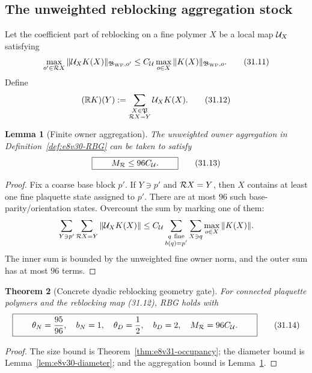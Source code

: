 \documentclass[11pt,oneside]{book}
\newtheorem{theorem}{Theorem}[chapter]
\newtheorem{lemma}[theorem]{Lemma}
\theoremstyle{definition}
\theoremstyle{remark}
\begin{document}
\subsection{The unweighted reblocking aggregation stock}

Let the coefficient part of reblocking on a fine polymer \(X\) be a
local map \({\cal U}_X\) satisfying
\[
 \max_{o'\in{\cal R}X}
 \|{\cal U}_XK(X)\|_{\mathfrak B_{\rm WP},o'}
 \leq C_{\cal U}
 \max_{o\in X}\|K(X)\|_{\mathfrak B_{\rm WP},o}.                  \tag{31.11}
\]
Define
\[
 ({\mathbb R}K)(Y):=
 \sum_{\substack{X\in{\mathfrak P}\\ {\cal R}X=Y}}
                         {\cal U}_XK(X).                          \tag{31.12}
\]

\begin{lemma}[Finite owner aggregation]
\label{lem:e8v31-aggregation}
The unweighted owner aggregation in
Definition~\ref{def:e8v30-RBG} can be taken to satisfy
\[
\boxed{\qquad
                         M_{\cal R}\leq96C_{\cal U}.
\qquad}                                                           \tag{31.13}
\]
\end{lemma}

\begin{proof}
Fix a coarse base block \(p'\).  If \(Y\ni p'\) and
\({\cal R}X=Y\), then \(X\) contains at least one fine plaquette state
assigned to \(p'\).  There are at most \(96\) such
base-parity/orientation states.  Overcount the sum by marking one of
them:
\[
 \sum_{Y\ni p'}\sum_{{\cal R}X=Y}
       \|{\cal U}_XK(X)\|
 \leq
 C_{\cal U}\sum_{\substack{q\ {\rm fine}\\b(q)=p'}}
       \sum_{X\ni q}\max_{o\in X}\|K(X)\|.
\]
The inner sum is bounded by the unweighted fine owner norm, and the
outer sum has at most \(96\) terms.
\end{proof}

\begin{theorem}[Concrete dyadic reblocking geometry gate]
\label{thm:e8v31-RBG}
For connected plaquette polymers and the reblocking map (31.12), RBG
holds with
\[
\boxed{\qquad
 \theta_N=\frac{95}{96},\quad b_N=1,\quad
 \theta_D=\frac12,\quad b_D=2,\quad
 M_{\cal R}=96C_{\cal U}.
\qquad}                                                           \tag{31.14}
\]
\end{theorem}

\begin{proof}
The size bound is Theorem~\ref{thm:e8v31-occupancy}; the diameter
bound is Lemma~\ref{lem:e8v30-diameter}; and the aggregation bound is
Lemma~\ref{lem:e8v31-aggregation}.
\end{proof}
\end{document}
